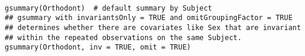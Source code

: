 
\begin{framed}
\begin{verbatim}

gsummary(Orthodont)  # default summary by Subject
## gsummary with invariantsOnly = TRUE and omitGroupingFactor = TRUE
## determines whether there are covariates like Sex that are invariant
## within the repeated observations on the same Subject.
gsummary(Orthodont, inv = TRUE, omit = TRUE)

\end{verbatim}
\end{framed}


